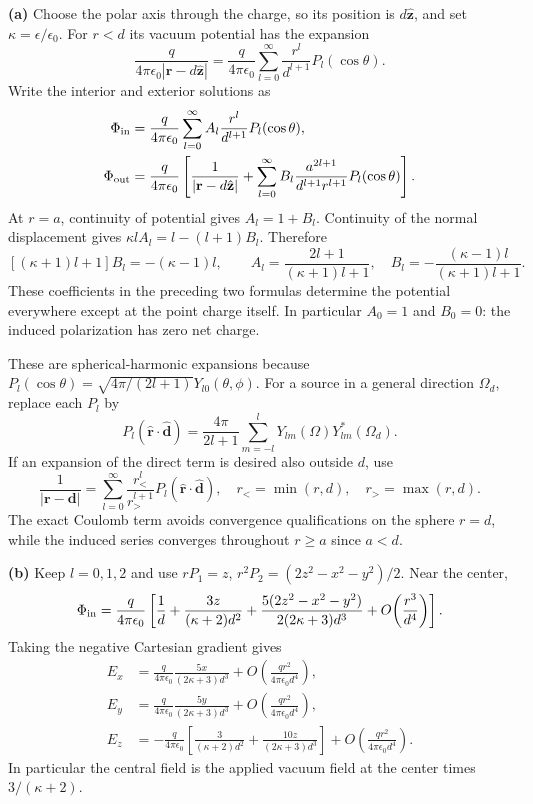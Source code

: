 \textbf{(a)} Choose the polar axis through the charge, so its position
is $d\hat{\mathbf z}$, and set $\kappa=\epsilon/\epsilon_0$.
For $r<d$ its vacuum potential has the expansion
\[
\frac{q}{4\pi\epsilon_0|\mathbf r-d\hat{\mathbf z}|}
=\frac{q}{4\pi\epsilon_0}\sum_{l=0}^\infty
\frac{r^l}{d^{l+1}}P_l(\cos\theta).
\]
Write the interior and exterior solutions as
\begin{align*}
\Phi_{\rm in}&=\frac{q}{4\pi\epsilon_0}\sum_{l=0}^\infty
A_l\frac{r^l}{d^{l+1}}P_l(\cos\theta),\\
\Phi_{\rm out}&=\frac{q}{4\pi\epsilon_0}\left[
\frac1{|\mathbf r-d\hat{\mathbf z}|}
+\sum_{l=0}^\infty B_l\frac{a^{2l+1}}{d^{l+1}r^{l+1}}P_l(\cos\theta)\right].
\end{align*}
At $r=a$, continuity of potential gives $A_l=1+B_l$.
Continuity of the normal displacement gives
$\kappa l A_l=l-(l+1)B_l$. Therefore
\[
[(\kappa+1)l+1]B_l=-(\kappa-1)l,
\qquad
\boxed{A_l=\frac{2l+1}{(\kappa+1)l+1},\quad
B_l=-\frac{(\kappa-1)l}{(\kappa+1)l+1}.}
\]
These coefficients in the preceding two formulas determine the potential
everywhere except at the point charge itself. In particular $A_0=1$
and $B_0=0$: the induced polarization has zero net charge.

These are spherical-harmonic expansions because
$P_l(\cos\theta)=\sqrt{4\pi/(2l+1)}Y_{l0}(\theta,\phi)$.
For a source in a general direction $\Omega_d$, replace each $P_l$ by
\[
P_l(\hat{\mathbf r}\cdot\hat{\mathbf d})
=\frac{4\pi}{2l+1}\sum_{m=-l}^lY_{lm}(\Omega)Y_{lm}^{*}(\Omega_d).
\]
If an expansion of the direct term is desired also outside $d$, use
\[
\frac1{|\mathbf r-\mathbf d|}
=\sum_{l=0}^\infty\frac{r_<^l}{r_>^{l+1}}
P_l(\hat{\mathbf r}\cdot\hat{\mathbf d}),\quad
r_<=\min(r,d),\quad r_>=\max(r,d).
\]
The exact Coulomb term avoids convergence qualifications on the sphere
$r=d$, while the induced series converges throughout $r\geq a$ since
$a<d$.

\textbf{(b)} Keep $l=0,1,2$ and use
$rP_1=z$, $r^2P_2=(2z^2-x^2-y^2)/2$. Near the center,
\[
\Phi_{\rm in}=\frac{q}{4\pi\epsilon_0}\left[
\frac1d+\frac{3z}{(\kappa+2)d^2}
+\frac{5(2z^2-x^2-y^2)}{2(2\kappa+3)d^3}
+O\!\left(\frac{r^3}{d^4}\right)\right].
\]
Taking the negative Cartesian gradient gives
\begin{align*}
\boxed{E_x}&=\boxed{\frac{q}{4\pi\epsilon_0}\frac{5x}{(2\kappa+3)d^3}
+O\!\left(\frac{qr^2}{4\pi\epsilon_0d^4}\right)},\\
\boxed{E_y}&=\boxed{\frac{q}{4\pi\epsilon_0}\frac{5y}{(2\kappa+3)d^3}
+O\!\left(\frac{qr^2}{4\pi\epsilon_0d^4}\right)},\\
\boxed{E_z}&=\boxed{-\frac{q}{4\pi\epsilon_0}\left[
\frac{3}{(\kappa+2)d^2}+\frac{10z}{(2\kappa+3)d^3}\right]
+O\!\left(\frac{qr^2}{4\pi\epsilon_0d^4}\right)}.
\end{align*}
In particular the central field is the applied vacuum field at the
center times $3/(\kappa+2)$.

